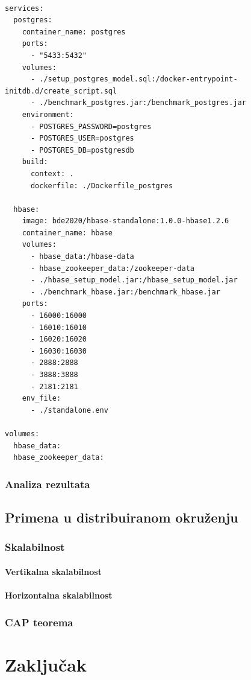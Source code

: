\documentclass[12pt,oneside]{memoir}
\begin{document}
\begin{lstlisting}[title={prepareEnv.sh},captionpos=t]

services: 
  postgres:
    container_name: postgres
    ports:
      - "5433:5432"
    volumes:
      - ./setup_postgres_model.sql:/docker-entrypoint-initdb.d/create_script.sql
      - ./benchmark_postgres.jar:/benchmark_postgres.jar
    environment:
      - POSTGRES_PASSWORD=postgres
      - POSTGRES_USER=postgres
      - POSTGRES_DB=postgresdb
    build:
      context: .
      dockerfile: ./Dockerfile_postgres

  hbase:
    image: bde2020/hbase-standalone:1.0.0-hbase1.2.6
    container_name: hbase
    volumes:
      - hbase_data:/hbase-data
      - hbase_zookeeper_data:/zookeeper-data
      - ./hbase_setup_model.jar:/hbase_setup_model.jar
      - ./benchmark_hbase.jar:/benchmark_hbase.jar
    ports:
      - 16000:16000
      - 16010:16010
      - 16020:16020
      - 16030:16030
      - 2888:2888
      - 3888:3888
      - 2181:2181
    env_file:
      - ./standalone.env

volumes:
  hbase_data:
  hbase_zookeeper_data:
\end{lstlisting}


\subsection{Analiza rezultata}

\section{Primena u distribuiranom okruženju}
\subsection{Skalabilnost}
\subsubsection{Vertikalna skalabilnost}
\subsubsection{Horizontalna skalabilnost}
\subsection{CAP teorema}

\chapter{Zaključak}
\end{document}
